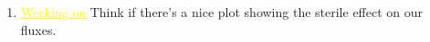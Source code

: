 \documentclass[11pt, a4paper]{article}
\newcommand{\newtext}[2]{\textcolor{#1}{\ul{#2}}}
\begin{document}
\begin{enumerate}
\item \newtext{MARK}{Working on} Think if there's a nice plot showing the sterile effect on our fluxes.

%


	\end{enumerate}







{}
\end{document}
